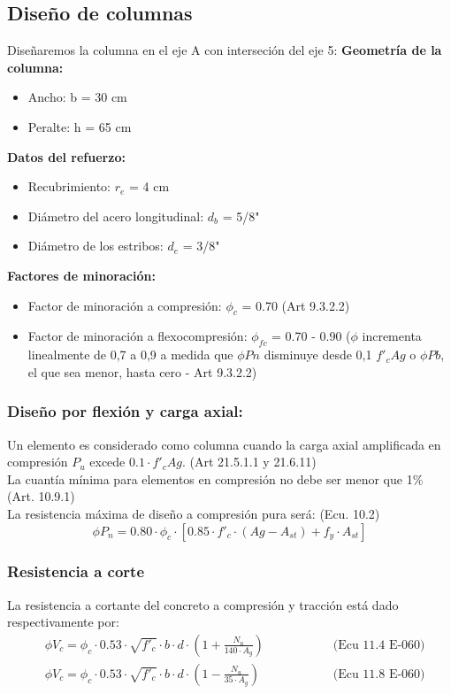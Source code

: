 \documentclass[12pt]{article}
\begin{document}
    \subsection{Diseño de columnas}
        Diseñaremos la columna en el eje A con interseción del eje 5:
        \textbf{Geometría de la columna:}
        \begin{itemize}
            \item Ancho: b = 30 cm
            \item Peralte: h = 65 cm            
        \end{itemize}
        \textbf{Datos del refuerzo:}
        \begin{itemize}
            \item Recubrimiento: $r_e$ = 4 cm
            \item Diámetro del acero longitudinal: $d_b$ = 5/8"
            \item Diámetro de los estribos: $d_e$ = 3/8"
        \end{itemize}
        \textbf{Factores de minoración:}
        \begin{itemize}
            \item Factor de minoración a compresión: $\phi_{c}$ = 0.70 (Art 9.3.2.2)
            \item Factor de minoración a flexocompresión: $\phi_{fc}$ = 0.70 - 0.90 ($\phi$ incrementa linealmente de 0,7 a 0,9 a medida que $\phi Pn$ disminuye desde 0,1 $f'_cAg$ o $\phi Pb$, el que sea menor, hasta cero - Art 9.3.2.2)
        \end{itemize}
        
        \subsubsection{Diseño por flexión y carga axial:}
        Un elemento es considerado como columna cuando la carga axial amplificada en compresión $P_u$ excede $0.1 \cdot f'_c Ag$. (Art 21.5.1.1 y 21.6.11)\\
        La cuantía mínima para elementos en compresión no debe ser menor que 1\% (Art. 10.9.1)\\
        La resistencia máxima de diseño a compresión pura será: (Ecu. 10.2)
        \[ \phi P_n = 0.80 \cdot \phi_c \cdot [0.85 \cdot f'_c \cdot (Ag - A_{st}) + f_y \cdot A_{st} ] \]

        \subsubsection{Resistencia a corte}
        La resistencia a cortante del concreto a compresión y tracción está dado respectivamente por:
        \begin{align*}
            &\phi V_c = \phi_c \cdot 0.53 \cdot \sqrt{f'_c} \cdot b \cdot d \cdot \left( 1 + \frac{N_u}{140 \cdot A_g} \right)   \hspace{2cm} & \text{(Ecu 11.4 E-060)}\\ 
            &\phi V_c = \phi_c \cdot 0.53 \cdot \sqrt{f'_c} \cdot b \cdot d \cdot \left( 1 - \frac{N_u}{35 \cdot A_g} \right) & \text{(Ecu 11.8 E-060)}
        \end{align*}
\end{document}
